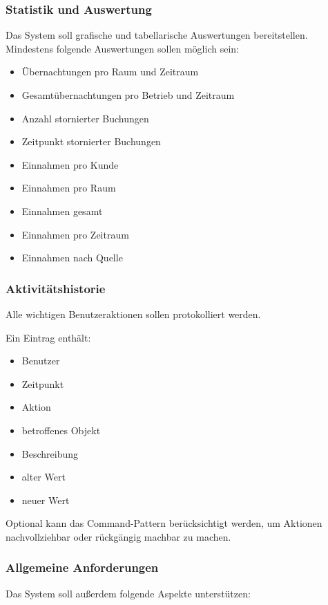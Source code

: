 \subsubsection{Statistik und Auswertung}

Das System soll grafische und tabellarische Auswertungen bereitstellen. Mindestens folgende Auswertungen sollen möglich sein:

\begin{itemize}
\item Übernachtungen pro Raum und Zeitraum
\item Gesamtübernachtungen pro Betrieb und Zeitraum
\item Anzahl stornierter Buchungen
\item Zeitpunkt stornierter Buchungen
\item Einnahmen pro Kunde
\item Einnahmen pro Raum
\item Einnahmen gesamt
\item Einnahmen pro Zeitraum
\item Einnahmen nach Quelle
\end{itemize}

\subsubsection{Aktivitätshistorie}

Alle wichtigen Benutzeraktionen sollen protokolliert werden.

Ein Eintrag enthält:

\begin{itemize}
\item Benutzer
\item Zeitpunkt
\item Aktion
\item betroffenes Objekt
\item Beschreibung
\item alter Wert
\item neuer Wert
\end{itemize}

Optional kann das Command-Pattern berücksichtigt werden, um Aktionen nachvollziehbar oder rückgängig machbar zu machen.

\subsubsection{Allgemeine Anforderungen}

Das System soll außerdem folgende Aspekte unterstützen:

